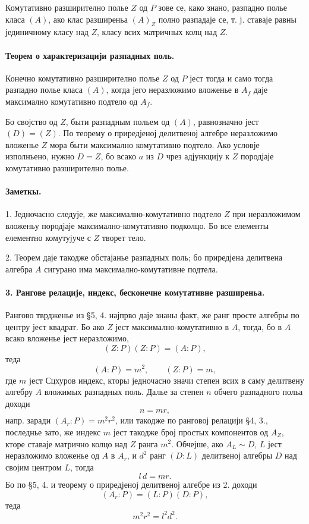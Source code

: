 ﻿\documentclass[11pt]{article}
\begin{document}
Комутативно разширително полье \(Z\) од \(P\) зове се, како знано, разпадно полье класа \((A)\), ако клас разширеньа \((A)_Z\) полно разпадаје се, т. ј. ставаје равны јединичному класу над \(Z\), класу всих матричных колц над \(Z\).

\paragraph{Теорем о характеризацији разпадных поль.}
Конечно комутативно разширително полье \(Z\) од \(P\) јест тогда и само тогда разпадно полье класа \((A)\), когда јего неразложимо вложенье в \(A_f\) даје максимално комутативно подтело од \(A_f\).

Бо својство од \(Z\), быти разпадным польем од \((A)\), равнозначно јест \((D)=(Z)\). По теорему о приредјеној делитвеној алгебре неразложимо вложенье \(Z\) мора быти максимално комутативно подтело. Ако условје изполньено, нужно \(D=Z\), бо всако \(a\) из \(D\) чрез адјункцију к \(Z\) породјаје комутативно разширително полье.

\paragraph{Заметкы.}
1. Једночасно следује, же максимално-комутативно подтело \(Z\) при неразложимом вложеньу породјаје максимално-комутативно подколцо. Бо все елементы елементно комутујуче с \(Z\) творет тело.

2. Теорем даје такодже обстајанье разпадных поль; бо приредјена делитвена алгебра \(A\) сигурано има максимално-комутативне подтела.

\paragraph{3. Рангове релације, индекс, бесконечне комутативне разширеньа.}
Рангово тврдженье из §5, 4. најпрво даје знаны факт, же ранг просте алгебры по центру јест квадрат. Бо ако \(Z\) јест максимално-комутативно в \(A\), тогда, бо в \(A\) всако вложенье јест неразложимо,
\[
        (Z:P)(Z:P)=(A:P),
\]
теда
\[
        (A:P)=m^2,\qquad (Z:P)=m,
\]
где \(m\) јест Сцхуров индекс, кторы једночасно значи степен всих в саму делитвену алгебру \(A\) вложимых разпадных поль. Далье за степен \(n\) обчего разпадного польа доходи
\[
        n=mr,
\]
напр. заради \((A_r:P)=m^2r^2\), или такодже по ранговој релацији §4, 3., последнье зато, же индекс \(m\) јест такодже број простых компонентов од \(A_Z\), кторе ставаје матрично колцо над \(Z\) ранга \(m^2\). Обчејше, ако \(A_L\sim D\), \(L\) јест неразложимо вложенье од \(A\) в \(A_r\), и \(d^2\) ранг \((D:L)\) делитвеној алгебры \(D\) над својим центром \(L\), тогда
\[
        l\,d=mr .
\]
Бо по §5, 4. и теорему о приредјеној делитвеној алгебре из 2. доходи
\[
        (A_r:P)=(L:P)(D:P),
\]
теда
\[
        m^2r^2=l^2d^2 .
\]
\end{document}
